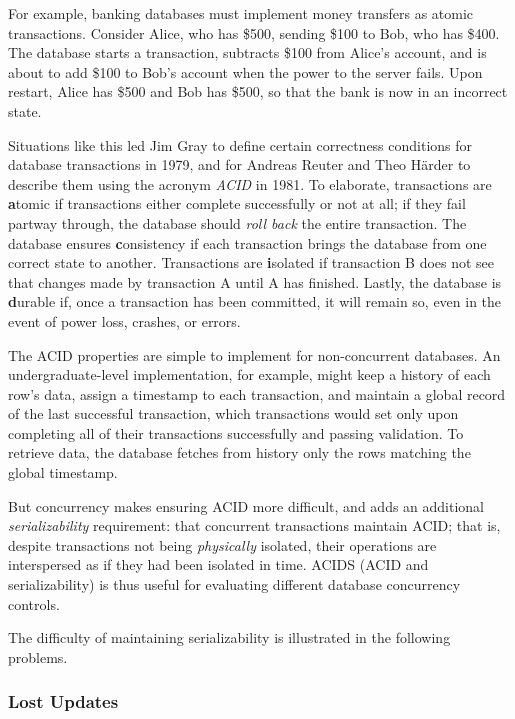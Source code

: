 \documentclass[12pt]{article} %
\begin{document}
For example, banking databases must implement money transfers as atomic transactions. Consider Alice, who has \$500, sending \$100 to Bob, who has \$400. The database starts a transaction, subtracts \$100 from Alice's account, and is about to add \$100 to Bob's account when the power to the server fails.  Upon restart, Alice has \$500 and Bob has \$500, so that the bank is now in an incorrect state. 

Situations like this led Jim Gray to define certain correctness conditions for database transactions in 1979, and for Andreas Reuter and Theo H{\"a}rder to describe them using the acronym \textit{ACID} in 1981. To elaborate, transactions are \textbf{a}tomic if transactions either complete successfully or not at all; if they fail partway through, the database should \textit{roll back} the entire transaction. The database ensures \textbf{c}onsistency if each transaction brings the database from one correct state to another. Transactions are \textbf{i}solated if transaction B does not see that changes made by transaction A until A has finished. Lastly, the database is \textbf{d}urable if, once a transaction has been committed, it will remain so, even in the event of power loss, crashes, or errors.

The ACID properties are simple to implement for non-concurrent databases. An undergraduate-level implementation, for example, might keep a history of each row's data, assign a timestamp to each transaction, and maintain a global record of the last successful transaction, which transactions would set only upon completing all of their transactions successfully and passing validation. To retrieve data, the database fetches from history only the rows matching the global timestamp.

But concurrency makes ensuring ACID more difficult, and adds an additional \textit{serializability} requirement: that concurrent transactions maintain ACID; that is, despite transactions not being \textit{physically} isolated, their operations are interspersed as if they had been isolated in time. ACIDS (ACID and serializability) is thus useful for evaluating different database concurrency controls.

The difficulty of maintaining serializability is illustrated in the following problems.

\subsubsection{Lost Updates}
\end{document}
